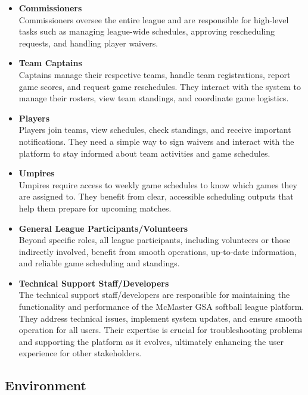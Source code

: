 \documentclass{article}
\begin{document}
\begin{itemize}
    \item \textbf{Commissioners} \\
    Commissioners oversee the entire league and are responsible for high-level tasks such as managing league-wide schedules, approving rescheduling requests, and handling player waivers.
    
    \item \textbf{Team Captains} \\
    Captains manage their respective teams, handle team registrations, report game scores, and request game reschedules. They interact with the system to manage their rosters, view team standings, and coordinate game logistics.
    
    \item \textbf{Players} \\
    Players join teams, view schedules, check standings, and receive important notifications. They need a simple way to sign waivers and interact with the platform to stay informed about team activities and game schedules.
    
    \item \textbf{Umpires} \\
    Umpires require access to weekly game schedules to know which games they are assigned to. They benefit from clear, accessible scheduling outputs that help them prepare for upcoming matches.
    
    \item \textbf{General League Participants/Volunteers} \\
    Beyond specific roles, all league participants, including volunteers or those indirectly involved, benefit from smooth operations, up-to-date information, and reliable game scheduling and standings.

    \item \textbf{Technical Support Staff/Developers} \\
    The technical support staff/developers are responsible for maintaining the functionality and performance of the McMaster GSA softball league platform. They address technical issues, implement system updates, and ensure smooth operation for all users. Their expertise is crucial for troubleshooting problems and supporting the platform as it evolves, ultimately enhancing the user experience for other stakeholders.

\end{itemize}


\subsection{Environment}
\end{document}

